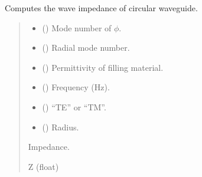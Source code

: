 \documentclass[letterpaper,10pt,english]{sphinxmanual}
\begin{document}

\begin{fulllineitems}
\label{\detokenize{components:components.Z_CWG}}
\pysigstartsignatures
{}
\pysigstopsignatures
\sphinxAtStartPar
Computes the wave impedance of circular waveguide.
\begin{quote}\begin{description}
\begin{itemize}
\item {}
\sphinxAtStartPar
{} () \textendash{} Mode number of \(\phi\).

\item {}
\sphinxAtStartPar
{} () \textendash{} Radial mode number.

\item {}
\sphinxAtStartPar
{} () \textendash{} Permittivity of filling material.

\item {}
\sphinxAtStartPar
{} () \textendash{} Frequency (Hz).

\item {}
\sphinxAtStartPar
{} () \textendash{} “TE” or “TM”.

\item {}
\sphinxAtStartPar
{} () \textendash{} Radius.

\end{itemize}

\sphinxAtStartPar
Impedance.

\sphinxAtStartPar
Z (float)

\end{description}\end{quote}

\end{fulllineitems}
\end{document}
